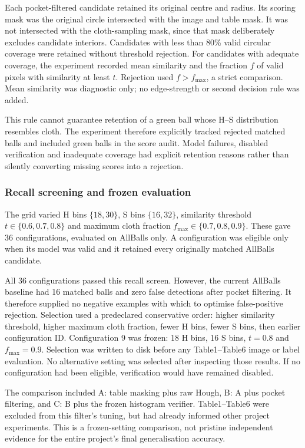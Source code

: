 Each pocket-filtered candidate retained its original centre and radius.
Its scoring mask was the original circle intersected with the image and
table mask. It was not intersected with the cloth-sampling mask, since that
mask deliberately excludes candidate interiors. Candidates with less than
80\% valid circular coverage were retained without threshold rejection.
For candidates with adequate coverage, the experiment recorded mean
similarity and the fraction $f$ of valid pixels with similarity at least
$t$. Rejection used $f>f_{\max}$, a strict comparison. Mean similarity
was diagnostic only; no edge-strength or second decision rule was added.

This rule cannot guarantee retention of a green ball whose H--S distribution
resembles cloth. The experiment therefore explicitly tracked rejected matched
balls and included green balls in the score audit. Model failures, disabled
verification and inadequate coverage had explicit retention reasons rather
than silently converting missing scores into a rejection.

\subsubsection{Recall screening and frozen evaluation}

The grid varied H bins $\{18,30\}$, S bins $\{16,32\}$,
similarity threshold $t\in\{0.6,0.7,0.8\}$ and maximum cloth fraction
$f_{\max}\in\{0.7,0.8,0.9\}$. These gave 36 configurations, evaluated
on AllBalls only. A configuration was eligible only when its model was
valid and it retained every originally matched AllBalls candidate.

All 36 configurations passed this recall screen. However, the current
AllBalls baseline had 16 matched balls and zero false detections after
pocket filtering. It therefore supplied no negative examples with which
to optimise false-positive rejection. Selection used a predeclared
conservative order: higher similarity threshold, higher maximum cloth
fraction, fewer H bins, fewer S bins, then earlier configuration ID.
Configuration 9 was frozen: 18 H bins, 16 S bins, $t=0.8$ and
$f_{\max}=0.9$. Selection was written to disk before any Table1--Table6
image or label evaluation. No alternative setting was selected after
inspecting those results. If no configuration had been eligible,
verification would have remained disabled.

The comparison included A: table masking plus raw Hough, B: A plus pocket
filtering, and C: B plus the frozen histogram verifier. Table1--Table6 were
excluded from this filter's tuning, but had already informed other project
experiments. This is a frozen-setting comparison, not pristine independent
evidence for the entire project's final generalisation accuracy.

